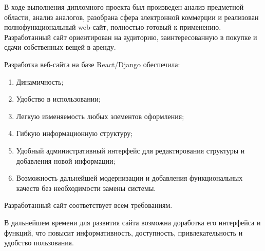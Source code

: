 
В ходе выполнения дипломного проекта был произведен анализ предметной области, анализ аналогов, разобрана сфера электронной коммерции и реализован полнофункциональный web-сайт, полностью готовый к применению.
Разработанный сайт ориентирован на аудиторию, заинтересованную в покупке и сдачи собственных вещей в аренду.

Разработка веб-сайта на базе React/Django обеспечила:
\begin{enumerate}[label=\arabic*)]
    \item Динамичность;
    \item Удобство в использовании;
    \item Легкую изменяемость любых элементов оформления;
    \item Гибкую информационную структуру;
    \item Удобный административный интерфейс для редактирования структуры и добавления новой информации;
    \item Возможность дальнейшей модернизации и добавления функциональных качеств без необходимости замены системы.
\end{enumerate}

Разработанный сайт соответствует всем требованиям.

В дальнейшем времени для развития сайта возможна доработка его интерфейса и функций, что повысит информативность, доступность, привлекательность и удобство пользования.
